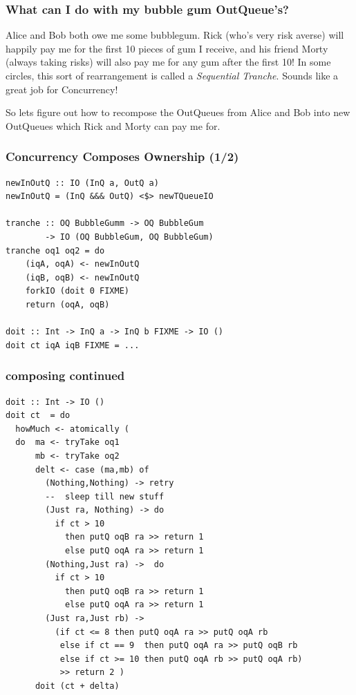 \documentclass[11pt,reqno]{beamer}
\begin{document}
\begin{frame}
  \frametitle{What can I do with my bubble gum OutQueue's?}
Alice and Bob both owe me some bubblegum. Rick (who's very risk averse) will happily pay me
for the first 10 pieces of gum I receive, and his friend Morty (always taking risks) will
also pay me for any gum after the first 10! In some circles, this sort of rearrangement
is called a \emph{Sequential Tranche}. Sounds like a great job for Concurrency!


So lets figure out how to recompose the OutQueues from Alice and Bob into new
OutQueues which Rick and Morty can pay me for.

\end{frame}

\begin{frame}[fragile]
\frametitle{Concurrency Composes Ownership (1/2)}

\begin{verbatim}
newInOutQ :: IO (InQ a, OutQ a)
newInOutQ = (InQ &&& OutQ) <$> newTQueueIO

tranche :: OQ BubbleGumm -> OQ BubbleGum
        -> IO (OQ BubbleGum, OQ BubbleGum)
tranche oq1 oq2 = do
    (iqA, oqA) <- newInOutQ
    (iqB, oqB) <- newInOutQ
    forkIO (doit 0 FIXME)
    return (oqA, oqB)

doit :: Int -> InQ a -> InQ b FIXME -> IO ()
doit ct iqA iqB FIXME = ...
\end{verbatim}
\end{frame}

\begin{frame}[fragile]\frametitle{composing continued}
    \begin{verbatim}
doit :: Int -> IO ()
doit ct  = do
  howMuch <- atomically (
  do  ma <- tryTake oq1
      mb <- tryTake oq2
      delt <- case (ma,mb) of
        (Nothing,Nothing) -> retry
        --  sleep till new stuff
        (Just ra, Nothing) -> do
          if ct > 10
            then putQ oqB ra >> return 1
            else putQ oqA ra >> return 1
        (Nothing,Just ra) ->  do
          if ct > 10
            then putQ oqB ra >> return 1
            else putQ oqA ra >> return 1
        (Just ra,Just rb) ->
          (if ct <= 8 then putQ oqA ra >> putQ oqA rb
           else if ct == 9  then putQ oqA ra >> putQ oqB rb
           else if ct >= 10 then putQ oqA rb >> putQ oqA rb)
           >> return 2 )
      doit (ct + delta)


    \end{verbatim}


\end{frame}
\end{document}
